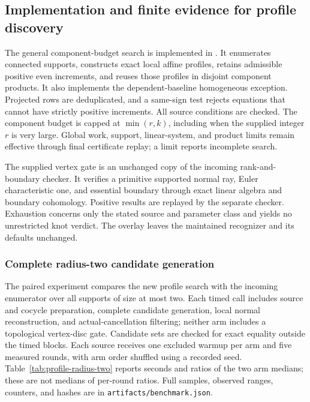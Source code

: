 \subsection{Implementation and finite evidence for profile discovery}
\label{sec:profile-evidence}

The general component-budget search is implemented in
. It enumerates connected supports,
constructs exact local affine profiles, retains admissible positive even
increments, and reuses those profiles in disjoint component products.
It also implements the dependent-baseline homogeneous exception.
Projected rows are deduplicated, and a same-sign test rejects equations
that cannot have strictly positive increments.  All source conditions
are checked.  The component budget is capped at $\min(r,k)$, including
when the supplied integer $r$ is very large.  Global work, support,
linear-system, and product limits remain effective through final
certificate replay; a limit reports incomplete search.

The supplied vertex gate is an unchanged copy of the incoming
rank-and-boundary checker.  It verifies a primitive supported normal
ray, Euler characteristic one, and essential boundary through exact
linear algebra and boundary cohomology.  Positive results are replayed
by the separate checker.  Exhaustion concerns only the stated source
and parameter class and yields no unrestricted knot verdict.  The
overlay leaves the maintained recognizer and its defaults unchanged.

\subsubsection{Complete radius-two candidate generation}

The paired experiment compares the new profile search with the incoming
enumerator over all supports of size at most two.  Each timed call
includes source and cocycle preparation, complete candidate generation,
local normal reconstruction, and actual-cancellation filtering; neither
arm includes a topological vertex-disc gate.  Candidate sets are checked
for exact equality outside the timed blocks.  Each source receives one
excluded warmup per arm and five measured rounds, with arm order
shuffled using a recorded seed.  Table~\ref{tab:profile-radius-two}
reports seconds and ratios of the two arm medians; these are not medians
of per-round ratios.  Full samples, observed ranges, counters, and hashes
are in \texttt{artifacts/benchmark.json}.

